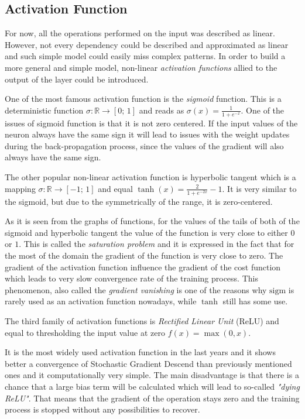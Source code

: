 \subsection{Activation Function}

For now, all the operations performed on the input was described as linear.
However, not every dependency could be described and approximated as linear and such simple model could easily miss complex patterns.
In order to build a more general and simple model, non-linear \textit{activation functions} allied to the output of the layer could be introduced.

One of the most famous activation function is the \textit{sigmoid} function.
This is a deterministic function $ \sigma : \mathbb{R} \rightarrow [0; \, 1] $ and reads as $ \sigma(x) = \frac{1}{1+e^{-x}} $.
One of the issues of sigmoid function is that it is not zero centered.
If the input values of the neuron always have the same sign it will lead to issues with the weight updates during the back-propagation process, since the values of the gradient will also always have the same sign.

The other popular non-linear activation function is hyperbolic tangent which is a mapping $ \sigma : \mathbb{R} \rightarrow [-1; \, 1]$ and equal $\tanh(x)=\frac{2}{1+e^{-2x}}-1$.
It is very similar to the sigmoid, but due to the symmetrically of the range, it is zero-centered.

As it is seen from the graphs of functions, for the values of the tails of both of the sigmoid and hyperbolic tangent the value of the function is very close to either $0$ or $1$.
This is called the \textit{saturation problem} and it is expressed in the fact that for the most of the domain the gradient of the function is very close to zero.
The gradient of the activation function influence the gradient of the cost function which leads to very slow convergence rate of the training process.
This phenomenon, also called the \textit{gradient vanishing} is one of the reasons why $\mathrm{sigm}$ is rarely used as an activation function nowadays, while $\tanh$ still has some use.

The third family of activation functions is \textit{Rectified Linear Unit} (ReLU) and equal to thresholding the input value at zero $f(x)=\max(0,x)$. 

It is the most widely used activation function in the last years and it shows better a convergence of Stochastic Gradient Descend than previously mentioned ones and it computationally very simple.
The main disadvantage is that there is a chance that a large bias term will be calculated which will lead to so-called \textit{"dying ReLU"}. 
That means that the gradient of the operation stays zero and the training process is stopped without any possibilities to recover. 

